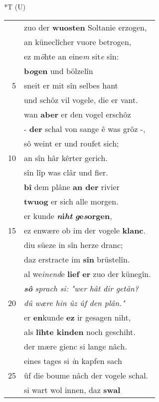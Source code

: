 \documentclass[8pt,a4paper,notitlepage]{article}
\begin{document}
\begin{table}[ht]
\begin{minipage}[t]{0.5\linewidth}
\end{minipage}
\hspace{0.5cm}
\begin{minipage}[t]{0.5\linewidth}
\small
\begin{center}*T (U)
\end{center}
\begin{tabular}{rl}
 & zuo der \textbf{wuosten} Soltanie erzogen,\\ 
 & an küneclîcher vuore betrogen,\\ 
 & ez m\textit{ö}hte an eine\textit{m} sit\textit{e} sîn:\\ 
 & \textbf{b\textit{o}gen} und bölzelîn\\ 
5 & sneit er mit sîn selbes hant\\ 
 & und schôz vil vogele, die er vant.\\ 
 & wan \textbf{aber} er den vogel erschôz\\ 
 & - \textbf{der} schal von sange ê was grôz -,\\ 
 & sô weint er und roufet sich;\\ 
10 & an sîn hâr kêrter gerich.\\ 
 & sîn lîp was clâr und fier.\\ 
 & \textbf{bî} dem plâne \textbf{an der} rivier\\ 
 & \textbf{twuog} er sich alle morgen.\\ 
 & er kunde \textbf{\textit{n}i\textit{ht}} \textbf{\textit{g}e\textit{s}orgen},\\ 
15 & ez enwære ob im der vogele \textbf{klanc}.\\ 
 & diu süeze in sîn herze dranc;\\ 
 & daz erstracte im \textbf{sîn} brüstelîn.\\ 
 & al we\textit{inend}e \textbf{lief er} zuo der künegîn.\\ 
 & \textit{\textbf{sô}} \textit{sprach si: "wer hât dir getân?}\\ 
20 & \textit{dû wære hin ûz ûf den plân."}\\ 
 & er \textbf{en}kunde \textbf{ez} ir gesagen niht,\\ 
 & als \textbf{lîhte kinden} noch geschiht.\\ 
 & der mære gienc si lange nâch.\\ 
 & eines tages si \textit{i}n kapfen sach\\ 
25 & ûf die boume nâch der vogele schal.\\ 
 & si wart wol innen, daz \textbf{swal}\\ 

\end{tabular}
\end{minipage}
\end{table}
\end{document}
